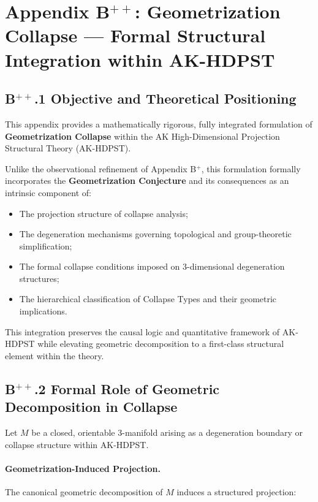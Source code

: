 \documentclass[11pt]{article}
\begin{document}
\section*{Appendix B$^{++}$: Geometrization Collapse — Formal Structural Integration within AK-HDPST}

\subsection*{B$^{++}$.1 Objective and Theoretical Positioning}

This appendix provides a mathematically rigorous, fully integrated formulation of \textbf{Geometrization Collapse} within the AK High-Dimensional Projection Structural Theory (AK-HDPST).

Unlike the observational refinement of Appendix B$^{+}$, this formulation formally incorporates the \textbf{Geometrization Conjecture} and its consequences as an intrinsic component of:

\begin{itemize}
    \item The projection structure of collapse analysis;
    \item The degeneration mechanisms governing topological and group-theoretic simplification;
    \item The formal collapse conditions imposed on 3-dimensional degeneration structures;
    \item The hierarchical classification of Collapse Types and their geometric implications.
\end{itemize}

This integration preserves the causal logic and quantitative framework of AK-HDPST while elevating geometric decomposition to a first-class structural element within the theory.

\subsection*{B$^{++}$.2 Formal Role of Geometric Decomposition in Collapse}

Let $M$ be a closed, orientable 3-manifold arising as a degeneration boundary or collapse structure within AK-HDPST.

\paragraph{Geometrization-Induced Projection.}
The canonical geometric decomposition of $M$ induces a structured projection:
\end{document}
